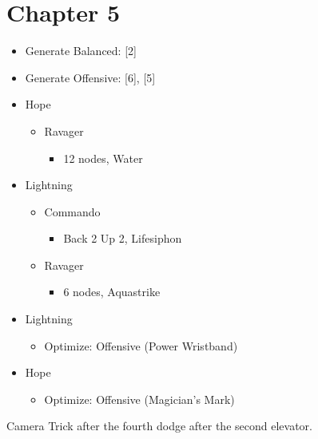 \chapter{Chapter 5}


\renewcommand{\first}{[1] Slash \& Burn (\rav/\com)}
\renewcommand{\second}{[2] War \& Peace (\med/\com)}
\renewcommand{\third}{[3] Supersoldier (\syn/\com)}
\renewcommand{\fourth}{[4] Dualcasting (\rav/\rav)}
\renewcommand{\fifth}{[5] Dualcasting (\rav/\rav)}
\renewcommand{\sixth}{[6] Slash \& Burn (\rav/\com)}
	\begin{menu}
		\begin{itemize}
			\paradigm
			\begin{itemize}
				\item Generate Balanced: [2]
				\item Generate Offensive: [6], [5]
			\end{itemize}
			\crystarium
			\begin{itemize}
				\item Hope
				      \begin{itemize}
					      \item Ravager
					            \begin{itemize}
						            \item 12 nodes, Water
					            \end{itemize}
				      \end{itemize}
				\item Lightning
				      \begin{itemize}
					      \item Commando
					            \begin{itemize}
						            \item Back 2 Up 2, Lifesiphon
					            \end{itemize}
					      \item Ravager
					            \begin{itemize}
						            \item 6 nodes, Aquastrike
					            \end{itemize}
				      \end{itemize}
			\end{itemize}
			\equip
			\begin{itemize}
				\item Lightning
				      \begin{itemize}
					      \item Optimize: Offensive (Power Wristband)
				      \end{itemize}
				\item Hope
				      \begin{itemize}
					      \item Optimize: Offensive (Magician's Mark)
				      \end{itemize}
			\end{itemize}
		\end{itemize}
	\end{menu}
	Camera Trick after the fourth dodge after the second elevator.

